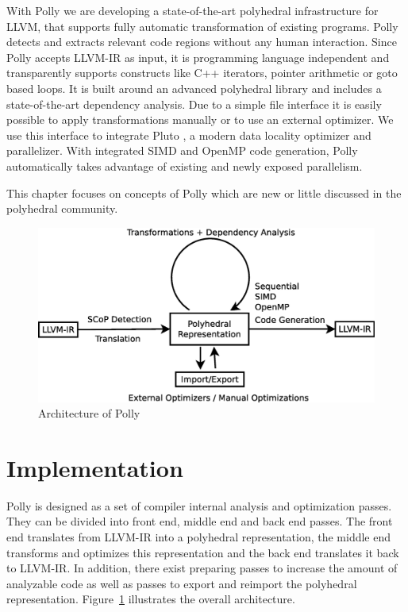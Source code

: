 With Polly we are developing a state-of-the-art polyhedral infrastructure for
LLVM, that supports fully automatic transformation of existing programs. Polly
detects and extracts relevant code regions without any human interaction. Since
Polly accepts LLVM-IR as input, it is programming language independent and
transparently supports constructs like C++ iterators, pointer arithmetic or
goto based loops. It is built around an advanced polyhedral library and includes a state-of-the-art
dependency analysis. Due to a simple file interface it is easily possible to
apply transformations manually or to use an external optimizer. We use this
interface to integrate Pluto \cite{uday08pldi}, a modern data locality
optimizer and parallelizer. With integrated SIMD and OpenMP code
generation, Polly automatically takes advantage of existing and newly exposed
parallelism.

This chapter focuses on concepts of Polly which are new or little discussed in the polyhedral community.

\begin{figure}
  \label{fig:arch}
  \includegraphics[width=1\textwidth]{images/architecture.eps}
  \caption{Architecture of Polly}
\end{figure}

\section{Implementation}

Polly is designed as a set of compiler internal analysis and optimization
passes. They can be divided into front end, middle end and back end passes. The
front end translates from LLVM-IR into a polyhedral representation, the middle
end transforms and optimizes this representation and the back end translates it
back to LLVM-IR. In addition, there exist preparing passes to increase the
amount of analyzable code as well as passes to export and reimport the polyhedral
representation.  Figure~\ref{fig:arch} illustrates the overall
architecture.

